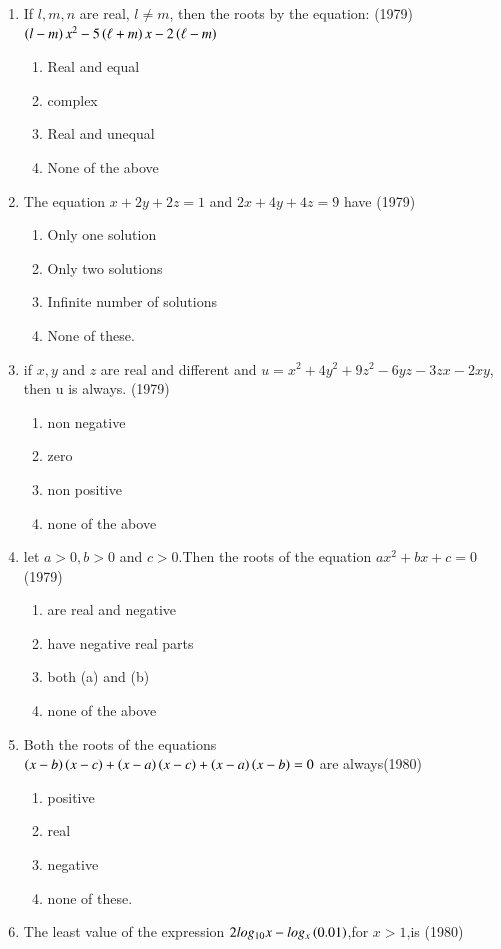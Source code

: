 \documentclass[journal,12pt,twocolumn]{IEEEtran}
\theoremstyle{remark}
\begin{document}
\begin{enumerate}
\item If $l,m,n$ are real, $l\neq m$, then the roots by the equation: 
\hfill (1979)
 $\left(l-m\right)x^2-5\left(\ell+m\right)x-2\left(\ell-m\right)$
\begin{enumerate}
\item Real and equal
\item complex
\item Real and unequal
\item None of the above 
\end{enumerate}
\item The equation $x+2y+2z=1$ and $2x+4y+4z=9$ have \hfill (1979)
\begin{enumerate}
\item Only one solution
\item Only two solutions
\item Infinite number of solutions
\item None of these.
\end{enumerate}
\item if $x,y$ and $z$ are real and different and 
$u=x^2+4y^2+9z^2-6yz-3zx-2xy$, then u is always.
\hfill (1979)
\begin{enumerate}
\item non negative
\item zero
\item non  positive
\item none of the above
\end{enumerate}
\item let $a>0,b>0$ and $c>0$.Then the roots of  the equation 
$ax^2+bx+c=0$ \hfill (1979)
\begin{enumerate} 
\item are real and negative
\item have negative real parts
\item both (a) and (b)
\item none of the above
\end{enumerate}
\item Both the roots of the equations 
$\left(x-b\right)\left(x-c\right)+\left(x-a\right)\left(x-c\right)+\left(x-a\right)\left(x-b\right) = 0$ are always\hfill (1980)
\begin{enumerate} 
\item positive
\item real
\item negative
\item none of these.
\end{enumerate}
\item The least value of the expression $2log_{10} x-log_x\left(0.01\right)$,for $x>1$,is \hfill (1980)

\end{enumerate}
\end{document}
